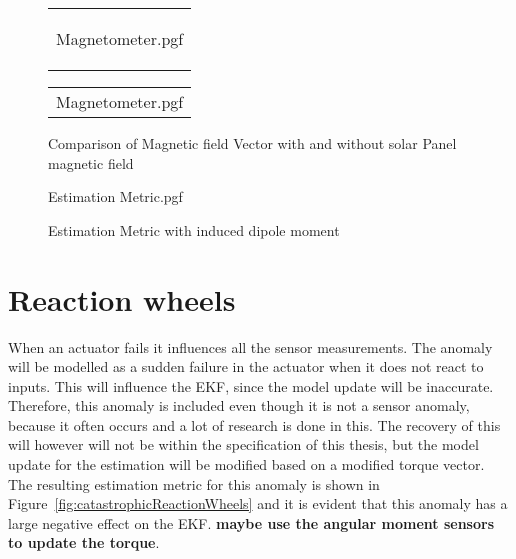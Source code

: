 \begin{figure*}[!htb]
	\begin{tabular}{@{}c@{}}
		\centering
		
		{Magnetometer.pgf}
		
		\label{fig:Magnetic field Vector comparison with solar Panel magnetic field}
	\end{tabular}
	\begin{tabular}{@{}c@{}}
		\centering
		{Magnetometer.pgf} 
		\label{fig:Magnetic field Vector comparison without solar Panel magnetic field}
	\end{tabular}
	
	\caption{Comparison of Magnetic field Vector with and without solar Panel magnetic field}
	\label{fig:Magnetometer Vector comparison}
\end{figure*}

\begin{figure}[!htb]
	\centering
	
	{Estimation Metric.pgf}
	
	\caption{Estimation Metric with induced dipole moment}
	\label{fig:solarPanelDipoleOnEstimation}
\end{figure}

\section{Reaction wheels}
When an actuator fails it influences all the sensor measurements. The anomaly will be modelled as a sudden failure in the actuator when it does not react to inputs. This will influence the EKF, since the model update will be inaccurate. Therefore, this anomaly is included even though it is not a sensor anomaly, because it often occurs and a lot of research is done in this. The recovery of this will however will not be within the specification of this thesis, but the model update for the estimation will be modified based on a modified torque vector. The resulting estimation metric for this anomaly is shown in Figure~\ref{fig:catastrophicReactionWheels} and it is evident that this anomaly has a large negative effect on the EKF. \textbf{maybe use the angular moment sensors to update the torque}.

